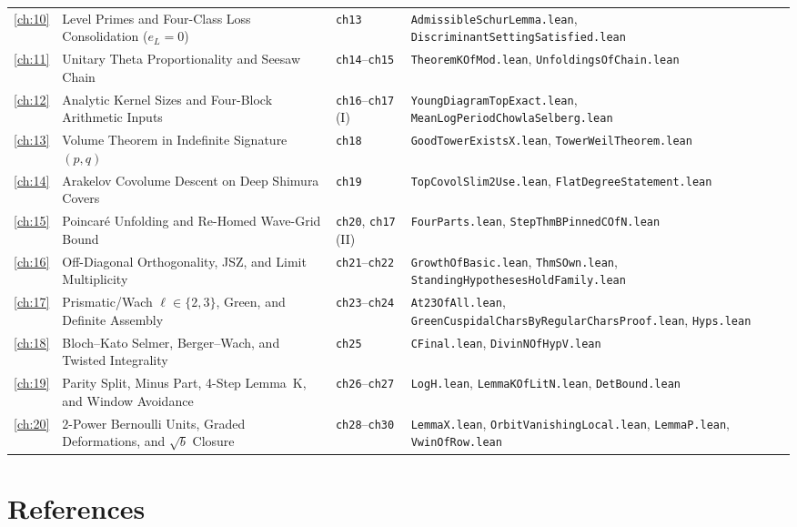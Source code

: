 \begin{longtable}{@{}c>{\raggedright\arraybackslash}p{5.6cm}>{\raggedright\arraybackslash}p{2.6cm}>{\raggedright\arraybackslash}p{6.4cm}@{}}
\ref{ch:10} & Level Primes and Four-Class Loss Consolidation ($e_L{=}0$) & \texttt{ch13} & \texttt{AdmissibleSchurLemma.lean}, \texttt{DiscriminantSettingSatisfied.lean} \\
\ref{ch:11} & Unitary Theta Proportionality and Seesaw Chain & \texttt{ch14}--\texttt{ch15} & \texttt{TheoremKOfMod.lean}, \texttt{UnfoldingsOfChain.lean} \\
\ref{ch:12} & Analytic Kernel Sizes and Four-Block Arithmetic Inputs & \texttt{ch16}--\texttt{ch17} (I) & \texttt{YoungDiagramTopExact.lean}, \texttt{MeanLogPeriodChowlaSelberg.lean} \\
\ref{ch:13} & Volume Theorem in Indefinite Signature $(p,q)$ & \texttt{ch18} & \texttt{GoodTowerExistsX.lean}, \texttt{TowerWeilTheorem.lean} \\
\ref{ch:14} & Arakelov Covolume Descent on Deep Shimura Covers & \texttt{ch19} & \texttt{TopCovolSlim2Use.lean}, \texttt{FlatDegreeStatement.lean} \\
\ref{ch:15} & Poincar\'e Unfolding and Re-Homed Wave-Grid Bound & \texttt{ch20}, \texttt{ch17} (II) & \texttt{FourParts.lean}, \texttt{StepThmBPinnedCOfN.lean} \\
\ref{ch:16} & Off-Diagonal Orthogonality, JSZ, and Limit Multiplicity & \texttt{ch21}--\texttt{ch22} & \texttt{GrowthOfBasic.lean}, \texttt{ThmSOwn.lean}, \texttt{StandingHypothesesHoldFamily.lean} \\
\ref{ch:17} & Prismatic/Wach $\ell{\in}\{2,3\}$, Green, and Definite Assembly & \texttt{ch23}--\texttt{ch24} & \texttt{At23OfAll.lean}, \texttt{GreenCuspidalCharsByRegularCharsProof.lean}, \texttt{Hyps.lean} \\
\ref{ch:18} & Bloch--Kato Selmer, Berger--Wach, and Twisted Integrality & \texttt{ch25} & \texttt{CFinal.lean}, \texttt{DivinNOfHypV.lean} \\
\ref{ch:19} & Parity Split, Minus Part, 4-Step Lemma~K, and Window Avoidance & \texttt{ch26}--\texttt{ch27} & \texttt{LogH.lean}, \texttt{LemmaKOfLitN.lean}, \texttt{DetBound.lean} \\
\ref{ch:20} & $2$-Power Bernoulli Units, Graded Deformations, and $\sqrt{b}$ Closure & \texttt{ch28}--\texttt{ch30} & \texttt{LemmaX.lean}, \texttt{OrbitVanishingLocal.lean}, \texttt{LemmaP.lean}, \texttt{VwinOfRow.lean} \\
\bottomrule
\end{longtable}

\section{References}
\label{sec:appB:references}

